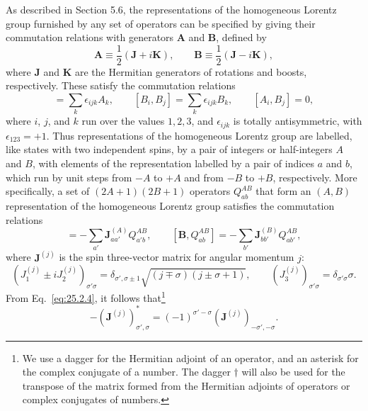 As described in Section 5.6, the representations of the homogeneous Lorentz
group furnished by any set of operators can be specified by giving their
commutation relations with generators \(\mathbf A\) and \(\mathbf B\),
defined by
\begin{equation}
\mathbf A\equiv\frac12(\mathbf J+i\mathbf K),
\qquad
\mathbf B\equiv\frac12(\mathbf J-i\mathbf K),
\tag{25.2.1}\label{eq:25.2.1}
\end{equation}
where \(\mathbf J\) and \(\mathbf K\) are the Hermitian generators of
rotations and boosts, respectively. These satisfy the commutation relations
\begin{equation}
[A_i,A_j]=\sum_k\epsilon_{ijk}A_k,
\qquad
[B_i,B_j]=\sum_k\epsilon_{ijk}B_k,
\qquad
[A_i,B_j]=0,
\tag{25.2.2}\label{eq:25.2.2}
\end{equation}
where \(i\), \(j\), and \(k\) run over the values \(1,2,3\), and
\(\epsilon_{ijk}\) is totally antisymmetric, with
\(\epsilon_{123}=+1\). Thus representations of the homogeneous Lorentz
group are labelled, like states with two independent spins, by a pair of
integers or half-integers \(A\) and \(B\), with elements of the
representation labelled by a pair of indices \(a\) and \(b\), which run by
unit steps from \(-A\) to \(+A\) and from \(-B\) to \(+B\), respectively.
More specifically, a set of \((2A+1)(2B+1)\) operators \(Q_{ab}^{AB}\)
that form an \((A,B)\) representation of the homogeneous Lorentz group
satisfies the commutation relations
\begin{equation}
[\mathbf A,Q_{ab}^{AB}]
=-\sum_{a'}\mathbf J_{aa'}^{(A)}Q_{a'b}^{AB},
\qquad
[\mathbf B,Q_{ab}^{AB}]
=-\sum_{b'}\mathbf J_{bb'}^{(B)}Q_{ab'}^{AB},
\tag{25.2.3}\label{eq:25.2.3}
\end{equation}
where \(\mathbf J^{(j)}\) is the spin three-vector matrix for angular
momentum \(j\):
\begin{equation}
\left(J_1^{(j)}\mathbin{\pm}iJ_2^{(j)}\right)_{\sigma'\sigma}
=\delta_{\sigma',\sigma\pm1}
\sqrt{(j\mp\sigma)(j\pm\sigma+1)},
\qquad
\left(J_3^{(j)}\right)_{\sigma'\sigma}
=\delta_{\sigma'\sigma}\sigma.
\tag{25.2.4}\label{eq:25.2.4}
\end{equation}
From Eq.~\eqref{eq:25.2.4}, it follows that\footnote{We use a dagger for
the Hermitian adjoint of an operator, and an asterisk for the complex
conjugate of a number. The dagger \(\dagger\) will also be used for the
transpose of the matrix formed from the Hermitian adjoints of operators or
complex conjugates of numbers.}
\begin{equation}
-\left(\mathbf J^{(j)}\right)_{\sigma',\sigma}^{*}
=(-1)^{\sigma'-\sigma}
\left(\mathbf J^{(j)}\right)_{-\sigma',-\sigma}.
\tag{25.2.5}\label{eq:25.2.5}
\end{equation}
